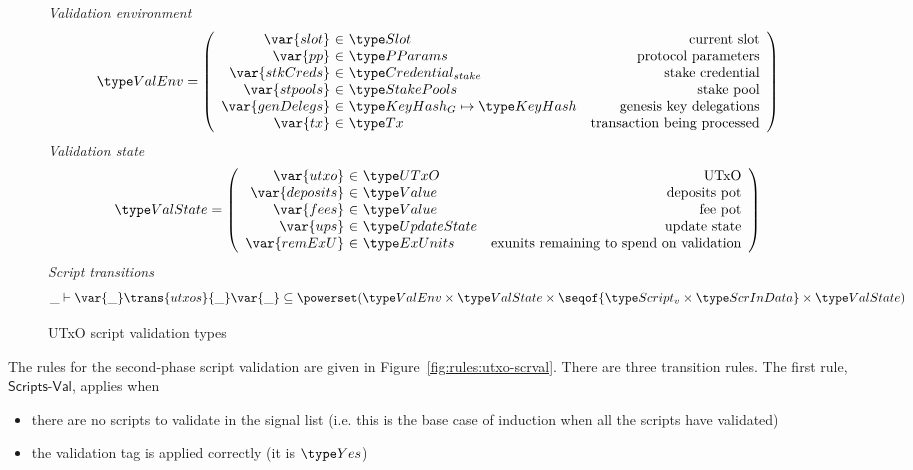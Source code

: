\begin{figure}[htb]
  \emph{Validation environment}
  \begin{equation*}
    \ValEnv =
    \left(
      \begin{array}{r@{~\in~}lr}
        \var{slot} & \Slot & \text{current slot}\\
        \var{pp} & \PParams & \text{protocol parameters}\\
        \var{stkCreds} & \StakeCredential & \text{stake credential}\\
        \var{stpools} & \StakePools & \text{stake pool}\\
        \var{genDelegs} & \KeyHashGen\mapsto\KeyHash & \text{genesis key delegations} \\
        \var{tx} & \Tx & \text{transaction being processed} \\
      \end{array}
    \right)
  \end{equation*}
  \emph{Validation state}
  \begin{equation*}
    \ValState =
    \left(
      \begin{array}{r@{~\in~}lr}
        \var{utxo} & \UTxO & \text{UTxO}\\
        \var{deposits} & \Value & \text{deposits pot}\\
        \var{fees} & \Value & \text{fee pot}\\
        \var{ups} & \UpdateState & \text{update state}\\
        \var{remExU} & \ExUnits & \text{exunits remaining to spend on validation} \\
      \end{array}
    \right)
  \end{equation*}
  \emph{Script transitions}
  \begin{equation*}
    \_ \vdash
    \var{\_} \trans{utxos}{\_} \var{\_}
    \subseteq \powerset (\ValEnv \times \ValState \times \seqof{\ScriptV\times\ScrInData} \times \ValState)
  \end{equation*}
  \caption{UTxO script validation types}
  \label{fig:ts-types:utxo-scripts}
\end{figure}

The rules for the second-phase script validation are given in
Figure~\ref{fig:rules:utxo-scrval}. There are three transition rules.
The first rule, $\mathsf{Scripts\mbox{-}Val}$, applies when

\begin{itemize}
\item there
are no scripts to validate in the signal list (i.e. this is the base case of
induction when all the scripts have validated)
\item the validation tag is applied correctly (it is $\Yes$)
\end{itemize}


